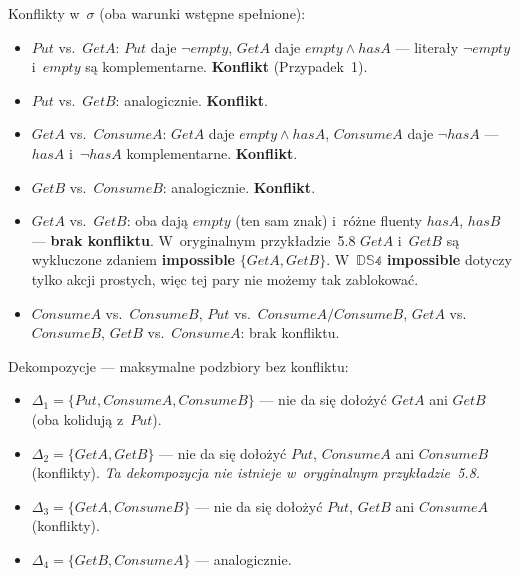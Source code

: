 \documentclass[11pt,a4paper]{article}
\newif\ifshowbib
\newcommand{\bibonly}[1]{\ifshowbib#1\fi}
\renewcommand{\cite}[2][]{\unskip}%
\newcommand{\impossible}{\textbf{impossible}}
\theoremstyle{definition}
\begin{document}
\smallskip\noindent
Konflikty w~$\sigma$ (oba warunki wstępne spełnione):
\begin{itemize}
  \item $\mathit{Put}$ vs.\ $\mathit{GetA}$:
        $\mathit{Put}$ daje $\neg\mathit{empty}$,
        $\mathit{GetA}$ daje $\mathit{empty} \land \mathit{hasA}$ ---
        literały $\neg\mathit{empty}$ i~$\mathit{empty}$ są komplementarne.
        \textbf{Konflikt} (Przypadek~1).
  \item $\mathit{Put}$ vs.\ $\mathit{GetB}$: analogicznie. \textbf{Konflikt}.
  \item $\mathit{GetA}$ vs.\ $\mathit{ConsumeA}$:
        $\mathit{GetA}$ daje $\mathit{empty} \land \mathit{hasA}$,
        $\mathit{ConsumeA}$ daje $\neg\mathit{hasA}$ ---
        $\mathit{hasA}$ i~$\neg\mathit{hasA}$ komplementarne.
        \textbf{Konflikt}.
  \item $\mathit{GetB}$ vs.\ $\mathit{ConsumeB}$: analogicznie. \textbf{Konflikt}.
  \item $\mathit{GetA}$ vs.\ $\mathit{GetB}$:
        oba dają $\mathit{empty}$ (ten sam znak) i~różne fluenty $\mathit{hasA}$,
        $\mathit{hasB}$ --- \textbf{brak konfliktu}.
        W~oryginalnym przykładzie~5.8\bibonly{ z~\cite{rw05}} $\mathit{GetA}$ i~$\mathit{GetB}$
        są wykluczone zdaniem \impossible{} $\{\mathit{GetA}, \mathit{GetB}\}$.
        W~$\mathbb{DS4}$ \impossible{} dotyczy tylko akcji prostych, więc
        tej pary nie możemy tak zablokować.
  \item $\mathit{ConsumeA}$ vs.\ $\mathit{ConsumeB}$,
        $\mathit{Put}$ vs.\ $\mathit{ConsumeA}/\mathit{ConsumeB}$,
        $\mathit{GetA}$ vs.\ $\mathit{ConsumeB}$,
        $\mathit{GetB}$ vs.\ $\mathit{ConsumeA}$: brak konfliktu.
\end{itemize}

\noindent Dekompozycje --- maksymalne podzbiory bez konfliktu:
\begin{itemize}
  \item $\Delta_1 = \{\mathit{Put}, \mathit{ConsumeA}, \mathit{ConsumeB}\}$ ---
        nie da się dołożyć $\mathit{GetA}$ ani $\mathit{GetB}$
        (oba kolidują z~$\mathit{Put}$).
  \item $\Delta_2 = \{\mathit{GetA}, \mathit{GetB}\}$ ---
        nie da się dołożyć $\mathit{Put}$, $\mathit{ConsumeA}$
        ani $\mathit{ConsumeB}$ (konflikty).
        \emph{Ta dekompozycja nie istnieje w~oryginalnym przykładzie~5.8.}
  \item $\Delta_3 = \{\mathit{GetA}, \mathit{ConsumeB}\}$ ---
        nie da się dołożyć $\mathit{Put}$, $\mathit{GetB}$
        ani $\mathit{ConsumeA}$ (konflikty).
  \item $\Delta_4 = \{\mathit{GetB}, \mathit{ConsumeA}\}$ --- analogicznie.
\end{itemize}
\end{document}
